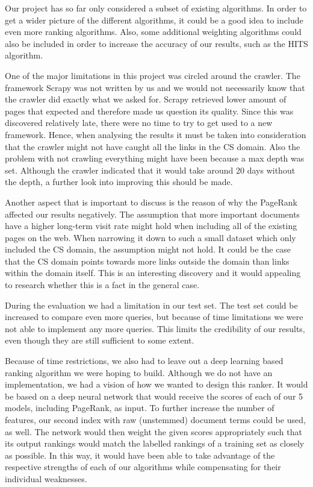 Our project has so far only considered a subset of existing algorithms. In order to get a wider picture of the different algorithms, it could be a good idea to include even more ranking algorithms. Also, some additional weighting algorithms could also be included in order to increase the accuracy of our results, such as the HITS algorithm.

One of the major limitations in this project was circled around the crawler. The framework Scrapy was not written by us and we would not necessarily know that the crawler did exactly what we asked for. Scrapy retrieved lower amount of pages that expected and therefore made us question its quality. Since this was discovered relatively late, there were no time to try to get used to a new framework. Hence, when analysing the results it must be taken into consideration that the crawler might not have caught all the links in the CS domain. Also the problem with not crawling everything might have been because a max depth was set. Although the crawler indicated that it would take around 20 days without the depth, a further look into improving this should be made.

Another aspect that is important to discuss is the reason of why the PageRank affected our results negatively. The assumption that more important documents have a higher long-term visit rate might hold when including all of the existing pages on the web. When narrowing it down to such a small dataset which only included the CS domain, the assumption might not hold. It could be the case that the CS domain points towards more links outside the domain than links within the domain itself. This is an interesting discovery and it would appealing to research whether this is a fact in the general case.

During the evaluation we had a limitation in our test set. The test set could be increased to compare even more queries, but because of time limitations we were not able to implement any more queries. This limits the credibility of our results, even though they are still sufficient to some extent.

Because of time restrictions, we also had to leave out a deep learning based ranking algorithm we were hoping to build. Although we do not have an implementation, we had a vision of how we wanted to design this ranker. It would be based on a deep neural network that would receive the scores of each of our 5 models, including PageRank, as input. To further increase the number of features, our second index with raw (unstemmed) document terms could be used, as well. The network would then weight the given scores appropriately such that its output rankings would match the labelled rankings of a training set as closely as possible. In this way, it would have been able to take advantage of the respective strengths of each of our algorithms while compensating for their individual weaknesses.

